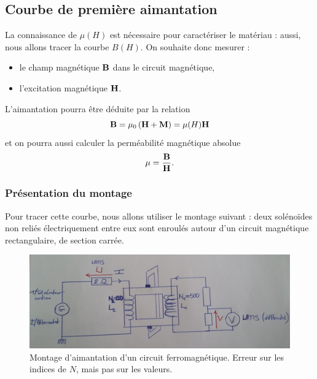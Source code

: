 \documentclass[11pt,a4paper]{report}
\begin{document}
\subsection{Courbe de première aimantation}
La connaissance de $\mu(H)$ est nécessaire pour caractériser le matériau : aussi, nous allons tracer la courbe $B(H)$. On souhaite donc mesurer :
\begin{itemize}
	\item le champ magnétique $\bold{B}$ dans le circuit magnétique,
	\item l'excitation magnétique $\bold{H}$.
\end{itemize}
L'aimantation pourra être déduite par la relation
\begin{equation}
	\bold{B} = \mu_0\left(\bold{H} + \bold{M}\right) = \mu(H)\bold{H}
\end{equation}
et on pourra aussi calculer la perméabilité magnétique absolue
\begin{equation}
	\mu = \frac{\bold{B}}{\bold{H}}.
\end{equation}

\subsubsection{Présentation du montage}
Pour tracer cette courbe, nous allons utiliser le montage suivant : deux solénoïdes non reliés électriquement entre eux sont enroulés autour d'un circuit magnétique rectangulaire, de section carrée.

\begin{figure}[h!]
\begin{center}
	\includegraphics[scale = 0.70]{montage.png}
	\caption{Montage d'aimantation d'un circuit ferromagnétique. Erreur sur les indices de $N$, mais 		pas sur les valeurs.} 
	\label{fig:montage}
\end{center}
\end{figure}
\end{document}
